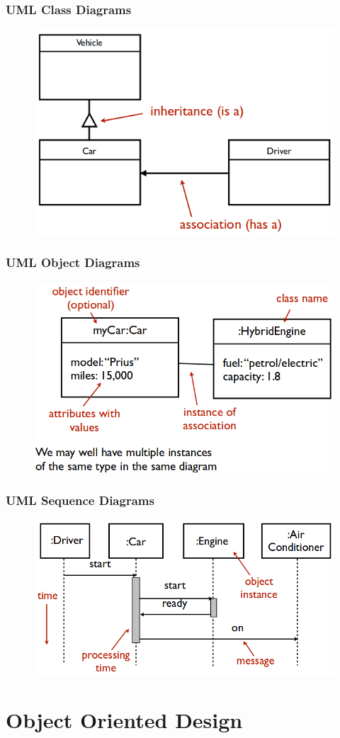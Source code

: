 \documentclass[twocolumn,english]{article}
\begin{document}
\subsubsection*{UML Class Diagrams}

\begin{figure}[H]
\centering{}\includegraphics[width=0.35\columnwidth]{img/uml-class}
\end{figure}

\subsubsection*{UML Object Diagrams}

\begin{figure}[H]
\centering{}\includegraphics[width=0.4\columnwidth]{img/uml-object}
\end{figure}

\subsubsection*{UML Sequence Diagrams}

\begin{figure}[H]
\centering{}\includegraphics[width=0.5\columnwidth]{img/uml-sequence}
\end{figure}

\section{Object Oriented Design}
\end{document}
